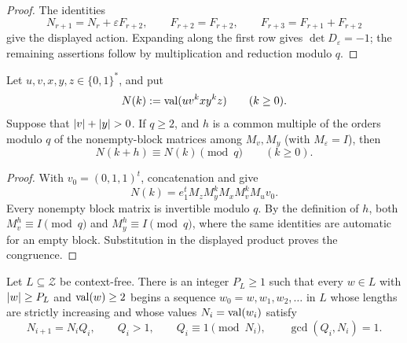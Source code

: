 \begin{proof}
  The identities
  \[
    N_{r+1}=N_r+\varepsilon F_{r+2},\qquad
    F_{r+2}=F_{r+2},\qquad F_{r+3}=F_{r+1}+F_{r+2}
  \]
  give the displayed action. Expanding along the first row gives
  \(\det D_\varepsilon=-1\); the remaining assertions follow by
  multiplication and reduction modulo \(q\).
\end{proof}

\begin{lemma}
  \label{lem:zeckendorf-paired-pumping-congruence}
  Let \(u,v,x,y,z\in\{0,1\}^\ast\), and put
  \[
    N(k):=\operatorname{val}(uv^kxy^kz)\qquad(k\ge0).
  \]
  Suppose that \(\lvert v \rvert+\lvert y \rvert>0\). If \(q\ge2\), and \(h\) is a
  common multiple of the orders modulo \(q\) of the nonempty-block
  matrices among \(M_v,M_y\) (with \(M_\varepsilon=I\)), then
  \[
    N(k+h)\equiv N(k)\pmod q
    \qquad(k\ge0).
  \]
\end{lemma}

\begin{proof}
  With \(v_0=(0,1,1)^t\), concatenation and
   give
  \[
    N(k)=e_1^tM_zM_y^kM_xM_v^kM_uv_0.
  \]
  Every nonempty block matrix is invertible modulo \(q\). By the
  definition of \(h\), both \(M_v^h\equiv I\pmod q\) and
  \(M_y^h\equiv I\pmod q\), where the same identities are automatic for
  an empty block. Substitution in the displayed product proves the
  congruence.
\end{proof}

\begin{theorem}
  \label{thm:context-free-coprime-quotient-zeckendorf-pumping}
  Let \(L\subseteq\mathcal Z\) be context-free. There is an integer
  \(P_L\ge1\) such that every \(w\in L\) with
  \(\lvert w \rvert\ge P_L\) and \(\operatorname{val}(w)\ge2\) begins a sequence
  \(w_0=w,w_1,w_2,\ldots\) in \(L\) whose lengths are strictly
  increasing and whose values \(N_i=\operatorname{val}(w_i)\) satisfy
  \[
    N_{i+1}=N_iQ_i,\qquad Q_i>1,\qquad
    Q_i\equiv1\pmod {N_i},\qquad \gcd(Q_i,N_i)=1.
  \]
\end{theorem}

